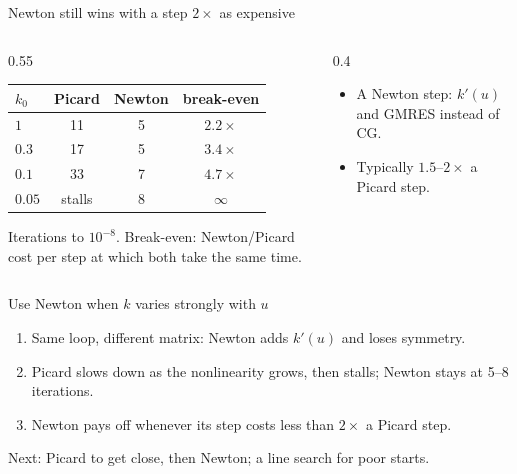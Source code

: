 \documentclass[aspectratio=169,11pt]{beamer}
\begin{document}
\begin{frame}{Newton still wins with a step $2\times$ as expensive}
  \noindent
  \begin{columns}[c,onlytextwidth]
    \begin{column}{0.55\textwidth}
      \begin{tabular}{@{}lccc@{}}
        \toprule
        {\color{tenue}$k_0$} & {\color{tenue}Picard} & {\color{tenue}Newton} & {\color{tenue}break-even} \\
        \midrule
        $1$    & 11 & 5 & $2.2\times$ \\
        $0.3$  & 17 & 5 & $3.4\times$ \\
        $0.1$  & 33 & 7 & $4.7\times$ \\
        $0.05$ & \alert{stalls} & 8 & $\infty$ \\
        \bottomrule
      \end{tabular}\par\vspace{0.25cm}
      {\footnotesize\color{tenue}Iterations to $10^{-8}$. Break-even: Newton/Picard cost per step at
      which both take the same time.}
    \end{column}
    \begin{column}{0.4\textwidth}
      \begin{itemize}\setlength\itemsep{0.8em}
        \item A Newton step: $k'(u)$ and GMRES instead of CG.
        \item Typically $1.5$--$2\times$ a Picard step.
      \end{itemize}
    \end{column}
  \end{columns}
\end{frame}

\begin{frame}{Use Newton when $k$ varies strongly with $u$}
  \vspace{0.4cm}
  \begin{enumerate}\setlength\itemsep{1.1em}
    \item Same loop, different matrix: Newton adds $k'(u)$ and loses symmetry.
    \item Picard slows down as the nonlinearity grows, then stalls;
          Newton stays at \alert{5--8 iterations}.
    \item Newton pays off whenever its step costs less than $2\times$ a Picard step.
  \end{enumerate}
  \vspace{0.6cm}
  {\color{tenue}Next: Picard to get close, then Newton; a line search for poor starts.}
\end{frame}
\end{document}
